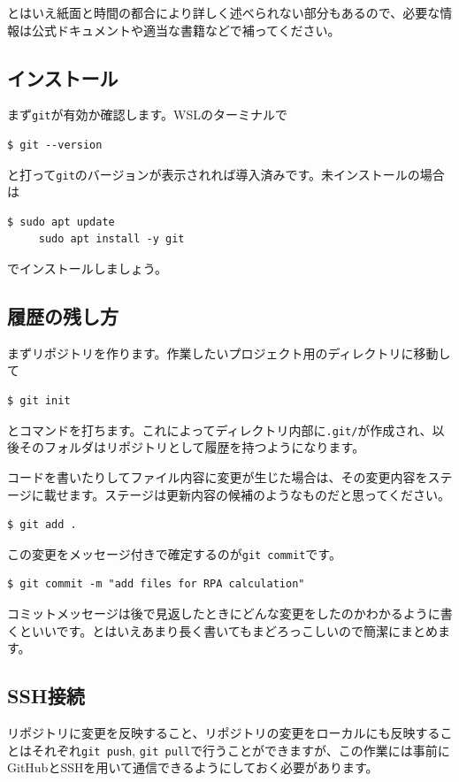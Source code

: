 \documentclass[12pt]{jreport}
\begin{document}
とはいえ紙面と時間の都合により詳しく述べられない部分もあるので、必要な情報は公式ドキュメントや適当な書籍などで補ってください。

\subsection{インストール}
まず\texttt{git}が有効か確認します。WSLのターミナルで
\begin{lstlisting}[style=terminal]
    $ git --version
\end{lstlisting}
と打って\texttt{git}のバージョンが表示されれば導入済みです。未インストールの場合は
\begin{lstlisting}[style=terminal]
    $ sudo apt update
     sudo apt install -y git
\end{lstlisting}
でインストールしましょう。

\subsection{履歴の残し方}
まずリポジトリを作ります。作業したいプロジェクト用のディレクトリに移動して
\begin{lstlisting}[style=terminal]
    $ git init
\end{lstlisting}
とコマンドを打ちます。これによってディレクトリ内部に\texttt{.git/}が作成され、以後そのフォルダはリポジトリとして履歴を持つようになります。

コードを書いたりしてファイル内容に変更が生じた場合は、その変更内容をステージに載せます。ステージは更新内容の候補のようなものだと思ってください。

\begin{lstlisting}[style=terminal]
    $ git add .
\end{lstlisting}

この変更をメッセージ付きで確定するのが\texttt{git commit}です。

\begin{lstlisting}[style=terminal]
    $ git commit -m "add files for RPA calculation"
\end{lstlisting}
コミットメッセージは後で見返したときにどんな変更をしたのかわかるように書くといいです。とはいえあまり長く書いてもまどろっこしいので簡潔にまとめます。

\subsection{SSH接続}
リポジトリに変更を反映すること、リポジトリの変更をローカルにも反映することはそれぞれ\texttt{git push}, \texttt{git pull}で行うことができますが、この作業には事前にGitHubとSSHを用いて通信できるようにしておく必要があります。
\end{document}
